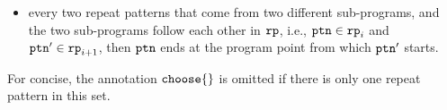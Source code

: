 \begin{defn}
\begin{itemize}
  \item 
  every two repeat patterns that come from two different sub-programs,
  and the two sub-programs follow each other in $\mathtt{rp}$, 
  i.e.,
  $\mathtt{ptn} \in \mathtt{rp}_i$ and $\mathtt{ptn}' \in \mathtt{rp}_{i + 1}$,
  then $\mathtt{ptn}$ ends at the program point from which $\mathtt{ptn}'$ starts.
  \end{itemize}
\end{defn}
%
For concise, the annotation $\rpchoose{}$ is omitted if there is only one repeat pattern in this set.

